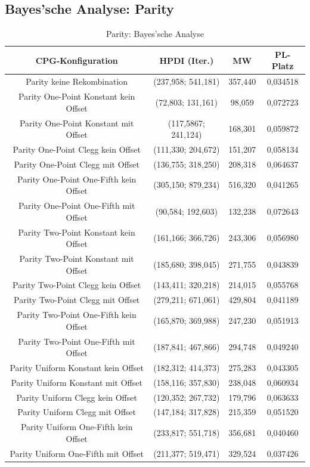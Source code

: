 \subsection{Bayes'sche Analyse: Parity}
\label{subsec:bayesParity}

\begin{table}[H]
	\centering
	\begin{tabular}{c | c | c | c}
		\textbf{CPG-Konfiguration} & \textbf{HPDI (Iter.)} & \textbf{MW} & \textbf{PL-Platz}\\
		\hline
		Parity keine Rekombination & (237,958; 541,181) & 357,440 & 0,034518\\
		\hline
		Parity One-Point Konstant kein Offset & (72,803; 131,161) & 98,059 & 0,072723\\
		\hline
		Parity One-Point Konstant mit Offset & (117,5867; 241,124) & 168,301 & 0,059872\\
		\hline
		Parity One-Point Clegg kein Offset & (111,330; 204,672) & 151,207 & 0,058134\\
		\hline
		Parity One-Point Clegg mit Offset & (136,755; 318,250) & 208,318 & 0,064637\\
		\hline
		Parity One-Point One-Fifth kein Offset & (305,150; 879,234) & 516,320 & 0,041265\\
		\hline
		Parity One-Point One-Fifth mit Offset & (90,584; 192,603) & 132,238 & 0,072643\\
		\hline
		Parity Two-Point Konstant kein Offset & (161,166; 366,726) & 243,306 & 0,056980\\
		\hline
		Parity Two-Point Konstant mit Offset & (185,680; 398,045) & 271,755 & 0,043839\\
		\hline
		Parity Two-Point Clegg kein Offset & (143,411; 320,218) & 214,015 & 0,055768\\
		\hline
		Parity Two-Point Clegg mit Offset & (279,211; 671,061) & 429,804 & 0,041189\\
		\hline
		Parity Two-Point One-Fifth kein Offset & (165,870; 369,988) & 247,230 & 0,051913\\
		\hline
		Parity Two-Point One-Fifth mit Offset & (187,841; 467,866) & 294,748 & 0,049240\\
		\hline
		Parity Uniform Konstant kein Offset & (182,312; 414,373) & 275,283 & 0,043305\\
		\hline
		Parity Uniform Konstant mit Offset & (158,116; 357,830) & 238,048 & 0,060934\\
		\hline
		Parity Uniform Clegg kein Offset & (120,352; 267,732) & 179,796 & 0,063633\\
		\hline
		Parity Uniform Clegg mit Offset & (147,184; 317,828) & 215,359 & 0,051520\\
		\hline
		Parity Uniform One-Fifth kein Offset & (233,817; 551,718) & 356,681 & 0,040460\\
		\hline
		Parity Uniform One-Fifth mit Offset & (211,377; 519,471) & 329,524 & 0,037426\\
	\end{tabular}
	\label{table:parityBayesian}
	\caption{Parity: Bayes'sche Analyse}
\end{table}

